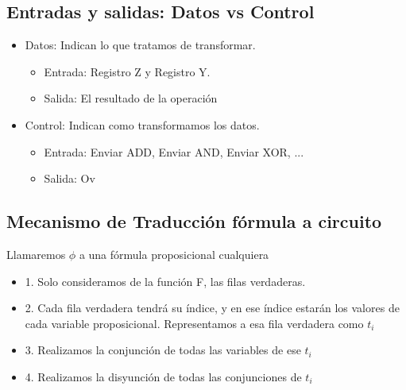 \documentclass[10pt,a4paper]{article}
\begin{document}
\subsection*{Entradas y salidas: Datos vs Control}
\begin{itemize}
    \item Datos: Indican lo que tratamos de transformar.
    \begin{itemize}
        \item Entrada: Registro Z y Registro Y.
        \item Salida: El resultado de la operación
    \end{itemize}
    \item Control: Indican como transformamos los datos.
    \begin{itemize}
        \item Entrada: Enviar ADD, Enviar AND, Enviar XOR, ...
        \item Salida: Ov
    \end{itemize}
\end{itemize} 

\subsection*{Mecanismo de Traducción fórmula a circuito}
Llamaremos \(\phi\) a una fórmula proposicional cualquiera
\begin{itemize}
    \item 1. Solo consideramos de la función F, las filas verdaderas.
    \item 2. Cada fila verdadera tendrá su índice, y en ese índice estarán los valores de cada variable proposicional. Representamos a esa fila verdadera como \(t_{i}\)
    \item 3. Realizamos la conjunción de todas las variables de ese \(t_{i}\)
    \item 4. Realizamos la disyunción de todas las conjunciones de \(t_{i}\)
\end{itemize} 
\end{document}
